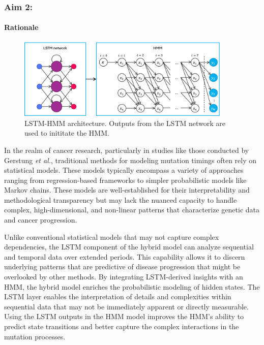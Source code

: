 \subsubsection{Aim 2: \SpecificAimTwo}

\paragraph{Rationale}

 \begin{figure}
  \begin{mdframed}
  \includegraphics[width=4.0in]{./Figures/LSTM-HMM_diagram.png}
  \caption{LSTM-HMM architecture. Outputs from the LSTM network are used to inititate the HMM.}
  \label{LSTM-HMM_diagram}
  \end{mdframed}
\end{figure}

In the realm of cancer research, particularly in studies like those conducted by Gerstung \textit{et al.}, 
traditional methods for modeling mutation timings often rely on statistical models.
These models typically encompass a variety of approaches ranging from regression-based 
frameworks to simpler probabilistic models like Markov chains.
These models are well-established for their interpretability and methodological transparency but 
may lack the nuanced capacity to handle complex, high-dimensional, 
and non-linear patterns that characterize genetic data and cancer progression. %

Unlike conventional statistical models that may not capture complex dependencies, 
the LSTM component of the hybrid model can analyze sequential and temporal data over extended periods. 
This capability allows it to discern underlying patterns that are predictive of 
disease progression that might be overlooked by other methods.
By integrating LSTM-derived insights with an HMM, 
the hybrid model enriches the probabilistic modeling of hidden states. 
The LSTM layer enables the interpretation of details and complexities within 
sequential data that may not be immediately apparent or directly measurable.
Using the LSTM outputs in the HMM model improves the HMM's ability to predict state transitions 
and better capture the complex interactions in the mutation processes.

